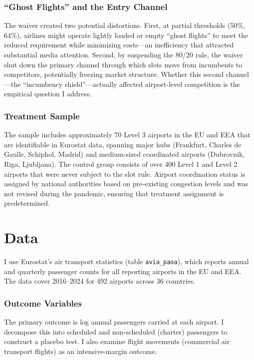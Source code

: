 \documentclass[12pt]{article}
\begin{document}
\subsubsection*{``Ghost Flights'' and the Entry Channel} The waiver created two potential distortions. First, at partial thresholds (50\%, 64\%), airlines might operate lightly loaded or empty ``ghost flights'' to meet the reduced requirement while minimizing costs---an inefficiency that attracted substantial media attention. Second, by suspending the 80/20 rule, the waiver shut down the primary channel through which slots move from incumbents to competitors, potentially freezing market structure. Whether this second channel---the ``incumbency shield''---actually affected airport-level competition is the empirical question I address.

\subsubsection*{Treatment Sample} The sample includes approximately 70 Level 3 airports in the EU and EEA that are identifiable in Eurostat data, spanning major hubs (Frankfurt, Charles de Gaulle, Schiphol, Madrid) and medium-sized coordinated airports (Dubrovnik, Riga, Ljubljana). The control group consists of over 400 Level 1 and Level 2 airports that were never subject to the slot rule. Airport coordination status is assigned by national authorities based on pre-existing congestion levels and was not revised during the pandemic, ensuring that treatment assignment is predetermined.

\section{Data}

I use Eurostat's air transport statistics (table \texttt{avia\_paoa}), which reports annual and quarterly passenger counts for all reporting airports in the EU and EEA. The data cover 2016--2024 for 492 airports across 36 countries.

\subsubsection*{Outcome Variables} The primary outcome is log annual passengers carried at each airport. I decompose this into scheduled and non-scheduled (charter) passengers to construct a placebo test. I also examine flight movements (commercial air transport flights) as an intensive-margin outcome.
\end{document}
